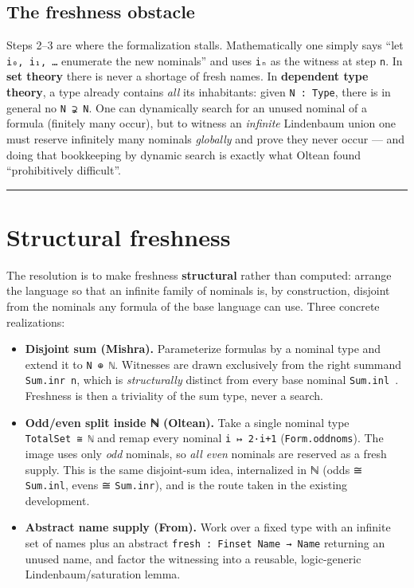 \documentclass[11pt,a4paper]{article}
\renewcommand{\_}{\origtextunderscore\allowbreak}
\begin{document}
\hypertarget{the-freshness-obstacle}{%
\subsection{The freshness obstacle}\label{the-freshness-obstacle}}

Steps 2--3 are where the formalization stalls. Mathematically one simply says ``let \texttt{i₀,\ i₁,\ …} enumerate the new nominals'' and uses \texttt{iₙ} as the witness at step \texttt{n}. In \textbf{set theory} there is never a shortage of fresh names. In \textbf{dependent type theory}, a type already contains \emph{all} its inhabitants: given \texttt{N\ :\ Type}, there is in general no \texttt{N\textquotesingle{}\ ⊋\ N}. One can dynamically search for an unused nominal of a formula (finitely many occur), but to witness an \emph{infinite} Lindenbaum union one must reserve infinitely many nominals \emph{globally} and prove they never occur --- and doing that bookkeeping by dynamic search is exactly what Oltean found ``prohibitively difficult''.

\begin{center}\rule{0.5\linewidth}{0.5pt}\end{center}

\hypertarget{structural-freshness}{%
\section{Structural freshness}\label{structural-freshness}}

The resolution is to make freshness \textbf{structural} rather than computed: arrange the language so that an infinite family of nominals is, by construction, disjoint from the nominals any formula of the base language can use. Three concrete realizations:

\begin{itemize}
\item
  \textbf{Disjoint sum (Mishra).} Parameterize formulas by a nominal type and extend it to \texttt{N\ ⊕\ ℕ}. Witnesses are drawn exclusively from the right summand \texttt{Sum.inr\ n}, which is \emph{structurally} distinct from every base nominal \texttt{Sum.inl\ \_}. Freshness is then a triviality of the sum type, never a search.
\item
  \textbf{Odd/even split inside ℕ (Oltean).} Take a single nominal type \texttt{TotalSet\ ≅\ ℕ} and remap every nominal \texttt{i\ ↦\ 2·i+1} (\texttt{Form.odd\_noms}). The image uses only \emph{odd} nominals, so \emph{all even} nominals are reserved as a fresh supply. This is the same disjoint-sum idea, internalized in ℕ (odds ≅ \texttt{Sum.inl}, evens ≅ \texttt{Sum.inr}), and is the route taken in the existing development.
\item
  \textbf{Abstract name supply (From).} Work over a fixed type with an infinite set of names plus an abstract \texttt{fresh\ :\ Finset\ Name\ →\ Name} returning an unused name, and factor the witnessing into a reusable, logic-generic Lindenbaum/saturation lemma.
\end{itemize}
\end{document}
